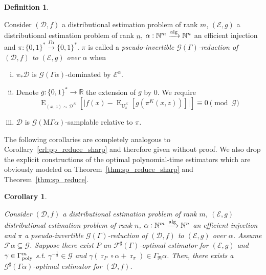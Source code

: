 \documentclass[11pt]{article}
\numberwithin{equation}{section}
\theoremstyle{definition}
\newtheorem{definition}{Definition}[section]
\theoremstyle{plain}
\newtheorem{corollary}{Corollary}[section]
\newcommand{\Bool}{\{0,1\}}
\newcommand{\Words}{{\Bool^*}}
\DeclareMathOperator{\E}{E}
\DeclareMathOperator{\R}{r}
\DeclareMathOperator{\Un}{U}
\newcommand{\Nats}{\mathbb{N}}
\newcommand{\Reals}{\mathbb{R}}
\newcommand{\Abs}[1]{\lvert #1 \rvert}
\newcommand{\Dist}{\mathcal{D}}
\newcommand{\GrowR}{\Gamma_{\mathfrak{R}}}
\newcommand{\MGrow}{\mathrm{M}\Gamma}
\newcommand{\Fall}{\mathcal{F}}
\newcommand{\ESG}{\Fall^\sharp(\Gamma)}
\newcommand{\GammaPoly}{\Gamma_{\textnormal{poly}}}
\newcommand{\Alg}{\xrightarrow{\textnormal{alg}}}
\begin{document}
\begin{samepage}
\begin{definition}
\label{def:p_reduce}

Consider $(\Dist,f)$ a distributional estimation problem of rank ${m}$, $(\mathcal{E},g)$ a distributional estimation problem of rank ${n}$, ${\alpha: \Nats^m \Alg \Nats^n}$ an efficient injection and ${\pi: \Words \xrightarrow{\Gamma \alpha} \Words}$. $\pi$ is called a \emph{pseudo-invertible $\mathcal{G}(\Gamma)$-reduction of $(\Dist,f)$ to $(\mathcal{E},g)$ over ${\alpha}$} when

\begin{enumerate}[(i)]

\item\label{con:def__p_reduce__dist} ${\pi_*\Dist}$ is ${\mathcal{G}(\Gamma \alpha)}$-dominated by ${\mathcal{E}^\alpha}$.

\item\label{con:def__p_reduce__fun} Denote ${\bar{g}: \Words \rightarrow \Reals}$ the extension of $g$ by 0. We require \[\E_{(x,z) \sim \Dist^{K}}[\Abs{f(x)-\E_{\Un_\pi^{K}}[g(\pi^{K}(x,z))]}] \equiv 0 \pmod{\mathcal{G}}\]

\item\label{con:def__p_reduce__smp} $\Dist$ is $\mathcal{G}(\MGrow \alpha)$-samplable relative to $\pi$.

\end{enumerate}

\end{definition}
\end{samepage}

The following corollaries are completely analogous to Corollary~\ref{crl:pp_reduce_sharp} and therefore given without proof. We also drop the explicit constructions of the optimal polynomial-time estimators which are obviously modeled on Theorem~\ref{thm:sp_reduce_sharp} and Theorem~\ref{thm:sp_reduce}.

\begin{samepage}
\begin{corollary}
\label{crl:p_reduce_sharp}

Consider $(\Dist,f)$ a distributional estimation problem of rank ${m}$, $(\mathcal{E},g)$ distributional estimation problem of rank ${n}$, ${\alpha: \Nats^m \Alg \Nats^n}$ an efficient injection and $\pi$ a pseudo-invertible $\mathcal{G}(\Gamma)$-reduction of $(\Dist, f)$ to $(\mathcal{E}, g)$ over ${\alpha}$. Assume ${\Fall\alpha \subseteq \mathcal{G}}$. Suppose there exist ${P}$ an $\ESG$-optimal estimator for $(\mathcal{E}, g)$ and ${\gamma \in \GammaPoly^m}$ s.t. ${\gamma^{-\frac{1}{2}} \in \mathcal{G}}$ and ${\gamma(\R_P \circ \alpha + \R_\pi) \in \GrowR \alpha}$. Then, there exists a $\mathcal{G}^\sharp (\Gamma \alpha)$-optimal estimator for $(\Dist, f)$.


\end{corollary}
\end{samepage}
\end{document}

